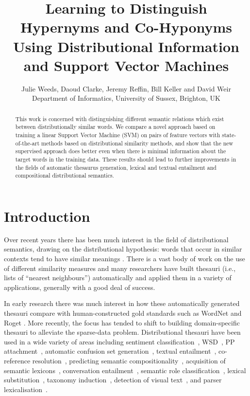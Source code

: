 \documentclass[11pt]{article}
\title{Learning to Distinguish Hypernyms and Co-Hyponyms Using Distributional Information and Support Vector Machines}
\author{Julie Weeds, Daoud Clarke, Jeremy Reffin, Bill Keller and David Weir\\ Department of Informatics, University of Sussex, Brighton, UK}
\date{} %
\begin{document}
\maketitle

\begin{abstract}
This work is concerned with distinguishing different semantic relations which exist between distributionally similar words.  We compare a novel approach based on training a linear Support Vector Machine (SVM) on pairs of feature vectors with state-of-the-art methods based on distributional similarity methods, and show that the new supervised approach does better even when there is minimal information about the target words in the training data.  These results should lead to further improvements in the fields of automatic thesaurus generation, lexical and textual entailment and compositional distributional semantics.
\end{abstract}
\section{Introduction}

Over recent years there has been much interest in the field of distributional semantics, drawing on the distributional hypothesis: words that occur in similar contexts tend to have similar meanings \cite{Harris1954}.   There is a vast body of work on the use of different similarity measures \cite{Lee1999,Weeds2003,Curran2004} and many researchers have built thesauri (i.e., lists of ``nearest neighbours'') automatically and applied them in a variety of applications, generally with a good deal of success.

In early research there was much interest in how these automatically generated thesauri compare with human-constructed gold standards such as WordNet and Roget \cite{Lin1998,Kilgarriff2000}.  More recently, the focus has tended to shift to building domain-specific thesauri to alleviate the sparse-data problem.  Distributional thesauri have been used in a wide variety of areas including sentiment classification~\cite{Bollegala2011}, WSD~\cite{miller-EtAl:2012:PAPERS,khapra-EtAl:2010:ACL}, PP attachment~\cite{Calvo05distributionalthesaurus}, automatic confusion set generation~\cite{xue-hwa:2012:PAPERS}, textual entailment~\cite{berant-dagan-goldberger:2010:ACL}, co-reference resolution~\cite{lee-EtAl:2012:EMNLP-CoNLL}, predicting semantic compositionality~\cite{bergsma-EtAl:2010:EMNLP}, acquisition of semantic lexicons~\cite{mcintosh:2010:EMNLP}, conversation entailment~\cite{zhang-chai:2010:EMNLP}, semantic role classification~\cite{zapirain-EtAl:2010:NAACLHLT}, lexical substitution~\cite{szarvas-biemann-gurevych:2013:NAACL-HLT}, taxonomy induction~\cite{fountain-lapata:2012:NAACL-HLT}, detection of visual text~\cite{dodge-EtAl:2012:NAACL-HLT}, and parser lexicalisation~\cite{rei-briscoe:2013:NAACL-HLT}.  
\end{document}
